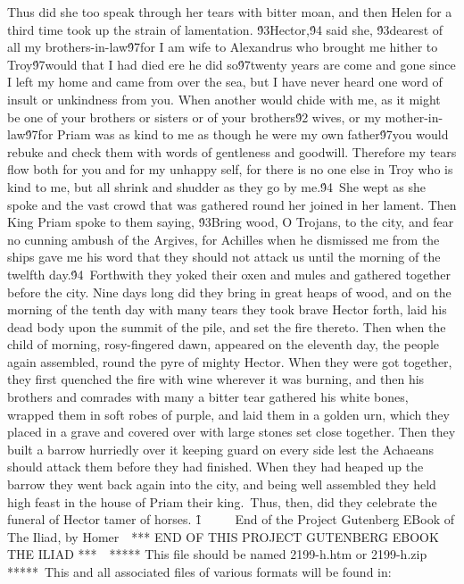 {Thus did she too speak through her tears with bitter moan, and then Helen for a third time took up the strain of lamentation. \'93Hector,\'94 said she, \'93dearest of all my brothers-in-law\'97for I am wife to Alexandrus who brought me hither to Troy\'97would that I had died ere he did so\'97twenty years are come and gone since I left my home and came from over the sea, but I have never heard one word of insult or unkindness from you. When another would chide with me, as it might be one of your brothers or sisters or of your brothers\'92 wives, or my mother-in-law\'97for Priam was as kind to me as though he were my own father\'97you would rebuke and check them with words of gentleness and goodwill. Therefore my tears flow both for you and for my unhappy self, for there is no one else in Troy who is kind to me, but all shrink and shudder as they go by me.\'94\
She wept as she spoke and the vast crowd that was gathered round her joined in her lament. Then King Priam spoke to them saying, \'93Bring wood, O Trojans, to the city, and fear no cunning ambush of the Argives, for Achilles when he dismissed me from the ships gave me his word that they should not attack us until the morning of the twelfth day.\'94\
Forthwith they yoked their oxen and mules and gathered together before the city. Nine days long did they bring in great heaps of wood, and on the morning of the tenth day with many tears they took brave Hector forth, laid his dead body upon the summit of the pile, and set the fire thereto. Then when the child of morning, rosy-fingered dawn, appeared on the eleventh day, the people again assembled, round the pyre of mighty Hector. When they were got together, they first quenched the fire with wine wherever it was burning, and then his brothers and comrades with many a bitter tear gathered his white bones, wrapped them in soft robes of purple, and laid them in a golden urn, which they placed in a grave and covered over with large stones set close together. Then they built a barrow hurriedly over it keeping guard on every side lest the Achaeans should attack them before they had finished. When they had heaped up the barrow they went back again into the city, and being well assembled they held high feast in the house of Priam their king.\
Thus, then, did they celebrate the funeral of Hector tamer of horses.
\f1 \
\pard\pardeftab720\qj\partightenfactor0
\cf2 \
\
\
End of the Project Gutenberg EBook of The Iliad, by Homer\
\
*** END OF THIS PROJECT GUTENBERG EBOOK THE ILIAD ***\
\
***** This file should be named 2199-h.htm or 2199-h.zip *****\
This and all associated files of various formats will be found in:\
}
